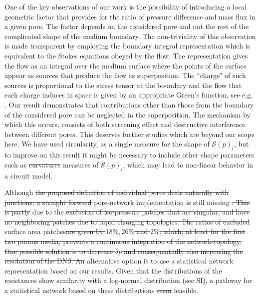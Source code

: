 \documentclass[draft]{agujournal2019}
\providecommand{\DIFadd}[1]{{\protect\color{blue}\uwave{#1}}} %
\providecommand{\DIFdel}[1]{{\protect\color{red}\sout{#1}}}                      %
\providecommand{\DIFaddbegin}{} %
\providecommand{\DIFaddend}{} %
\providecommand{\DIFdelbegin}{} %
\providecommand{\DIFdelend}{} %
\begin{document}
One of the key observations of our work is the possibility of introducing a local geometric factor that provides for the ratio of pressure difference and mass flux in a given pore. The factor depends on the considered pore and not the rest of the complicated shape of the medium boundary. The non-triviality of this observation is made transparent by employing the boundary integral representation which is equivalent to the Stokes equations obeyed by the flow. The representation gives the flow as an integral over the medium surface where the points of the surface appear as sources that produce the flow as superposition. The ``charge" of such sources is proportional to the stress tensor at the boundary and the flow that each charge induces in space is given by an appropriate Green's function, see e.g. \cite{pozrikidis_boundary_1992}. Our result demonstrates that contributions other than those from the boundary of the considered pore can be neglected in the superposition. The mechanism by which this occurs, consists of both screening effect and destructive interference between different pores. This deserves further studies which are beyond our scope here. We have used circularity, as a single measure for the shape of $\mathcal{S}(p)_i$, but to improve on this result it might be necessary to include other shape parameters such as \DIFdelbegin \DIFdel{curvatures }\DIFdelend \DIFaddbegin \DIFadd{curvature }\DIFaddend measures of $\mathcal{S}(p)_i$, which may lead to non-linear behavior in a circuit model. 

Although \DIFdelbegin \DIFdel{the proposed definition of individual pores deals naturally with junctions, a straight forward }\DIFdelend \DIFaddbegin \DIFadd{a }\DIFaddend pore-network implementation is still missing \DIFdelbegin \DIFdel{. This is partly }\DIFdelend due to the \DIFdelbegin \DIFdel{exclusion of iso-pressure patches that are singular, and have no neighboring patches due to rapid changing topologies. The ratios of excluded }\DIFdelend \DIFaddbegin \DIFadd{incomplete evaluation of all }\DIFaddend surface area patches\DIFdelbegin \DIFdel{are given by $18 \%, 26 \%$ and $2\%$, which, at least for the first two porous media, prevents a continuous integration of the network-topology. One possible solution is to decrease $\delta p$ and consequentially also increasing the resolution of the DNS. An }\DIFdelend \DIFaddbegin \DIFadd{, an }\DIFaddend alternative option is to use a statistical network representation based on our results. Given that the distributions of the resistances show similarity with a log-normal distribution (see SI), a pathway for a statistical network based on these distributions \DIFdelbegin \DIFdel{seem }\DIFdelend \DIFaddbegin \DIFadd{seems }\DIFaddend feasible. 
\end{document}
